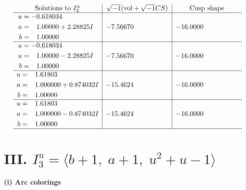 \documentclass[1p]{elsarticle_modified}
\theoremstyle{definition}
\newcommand{\I}{\sqrt{-1}}
\begin{document}
$$\begin{array}{c|c|c}  
\text{Solutions to }I^u_{2}& \I (\text{vol} + \sqrt{-1}CS) & \text{Cusp shape}\\
 \hline 
\begin{aligned}
u &= -0.618034\phantom{ +0.000000I} \\
a &= \phantom{-}1.00000 + 2.28825 I \\
b &= \phantom{-}1.00000\phantom{ +0.000000I}\end{aligned}
 & -7.56670\phantom{ +0.000000I} & -16.0000\phantom{ +0.000000I} \\ \hline\begin{aligned}
u &= -0.618034\phantom{ +0.000000I} \\
a &= \phantom{-}1.00000 - 2.28825 I \\
b &= \phantom{-}1.00000\phantom{ +0.000000I}\end{aligned}
 & -7.56670\phantom{ +0.000000I} & -16.0000\phantom{ +0.000000I} \\ \hline\begin{aligned}
u &= \phantom{-}1.61803\phantom{ +0.000000I} \\
a &= \phantom{-}1.000000 + 0.874032 I \\
b &= \phantom{-}1.00000\phantom{ +0.000000I}\end{aligned}
 & -15.4624\phantom{ +0.000000I} & -16.0000\phantom{ +0.000000I} \\ \hline\begin{aligned}
u &= \phantom{-}1.61803\phantom{ +0.000000I} \\
a &= \phantom{-}1.000000 - 0.874032 I \\
b &= \phantom{-}1.00000\phantom{ +0.000000I}\end{aligned}
 & -15.4624\phantom{ +0.000000I} & -16.0000\phantom{ +0.000000I}\\
 \hline 
 \end{array}$$\newpage\newpage\renewcommand{\arraystretch}{1}
\centering \section*{III. $I^u_{3}= \langle b+1,\;a+1,\;u^2+u-1 \rangle$}
\flushleft \textbf{(i) Arc colorings}\\
\end{document}
